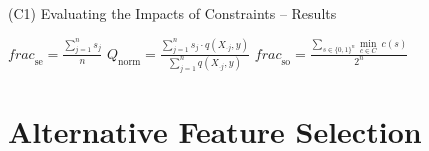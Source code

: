 \documentclass[en, navbarinline, handout]{sdqbeamer}
\begin{document}
\begin{frame}[t]{(C1) Evaluating the Impacts of Constraints -- Results}
\begin{figure}
\begin{subfigure}{0.48\textwidth}
		\end{subfigure}
	\end{figure}
	\centering
	$\mathit{frac}_{\text{se}} = \frac{\sum_{j=1}^{n} s_j}{n}$ \quad \vline \quad $Q_{\text{norm}} = \frac{\sum_{j=1}^{n} s_j  \cdot q(X_{\cdot{}j},y)}{\sum_{j=1}^{n} q(X_{\cdot{}j},y)}$ \quad \vline \quad $\mathit{frac}_{\text{so}} = \frac{\sum_{s \in \{0,1\}^n} \underset{c \in C}{\min}~c(s)}{2^n}$
\end{frame}

\section{Alternative Feature Selection}
\end{document}
